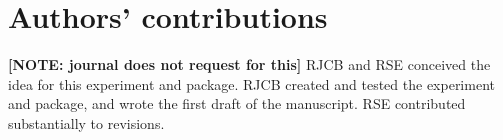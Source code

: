 \documentclass{article}
\begin{document}
\section{Authors' contributions}

\textbf{[NOTE: journal does not request for this]}
RJCB and RSE conceived the idea for this experiment and package. 
RJCB created and tested the experiment and package, 
and wrote the first draft of the manuscript. 
RSE contributed substantially to revisions.




\appendix
\end{document}
